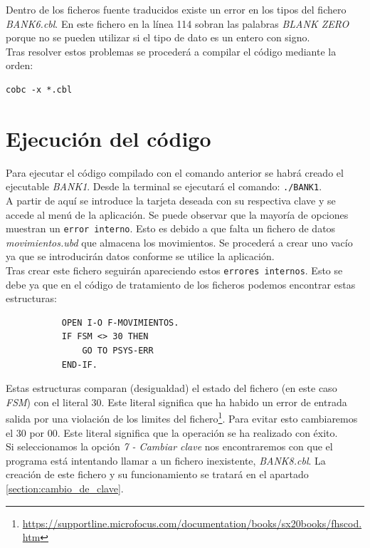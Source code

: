 \documentclass[10pt,a4paper]{article}
\begin{document}
Dentro de los ficheros fuente traducidos existe un error en los tipos del fichero \emph{BANK6.cbl}. En este fichero en la línea 114 sobran las palabras \emph{BLANK ZERO} porque no se pueden utilizar si el tipo de dato es un entero con signo.\\

Tras resolver estos problemas se procederá a compilar el código mediante la orden:

\begin{lstlisting}
cobc -x *.cbl
\end{lstlisting}

\section{Ejecución del código}

Para ejecutar el código compilado con el comando anterior se habrá creado el ejecutable \emph{BANK1}. Desde la terminal se ejecutará el comando: \texttt{./BANK1}.\\

A partir de aquí se introduce la tarjeta deseada con su respectiva clave y se accede al menú de la aplicación. Se puede observar que la mayoría de opciones muestran un \texttt{error interno}. Esto es debido a que falta un fichero de datos \emph{movimientos.ubd} que almacena los movimientos. Se procederá a crear uno vacío ya que se introducirán datos conforme se utilice la aplicación.\\
Tras crear este fichero seguirán apareciendo estos \texttt{errores internos}. Esto se debe ya que en el código de tratamiento de los ficheros podemos encontrar estas estructuras:

\begin{lstlisting}
           OPEN I-O F-MOVIMIENTOS.
           IF FSM <> 30 THEN
               GO TO PSYS-ERR
           END-IF.
\end{lstlisting}

Estas estructuras comparan (desigualdad) el estado del fichero (en este caso \emph{FSM}) con el literal 30. Este literal significa que ha habido un error de entrada salida por una violación de los limites del fichero\footnote{\url{https://supportline.microfocus.com/documentation/books/sx20books/fhscod.htm}}. Para evitar esto cambiaremos el 30 por 00. Este literal significa que la operación se ha realizado con éxito.\\

Si seleccionamos la opción \emph{7 - Cambiar clave} nos encontraremos con que el programa está intentando llamar a un fichero inexistente, \emph{BANK8.cbl}. La creación de este fichero y su funcionamiento se tratará en el apartado \ref{section:cambio_de_clave}.
\end{document}
